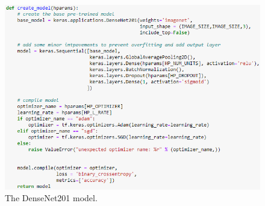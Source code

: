 \begin{figure}[H]
    \centering
    \includegraphics[width=\textwidth]{figures/densenet-model.png}
    \caption{The DenseNet201 model.}
    \label{fig:densenet-model}
\end{figure}

